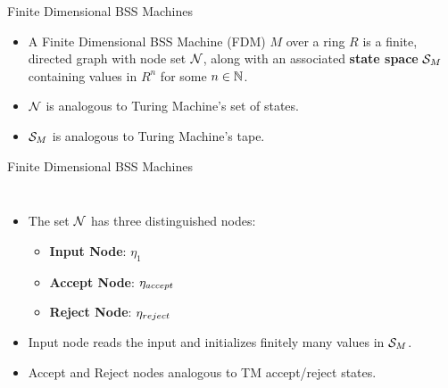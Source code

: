 \documentclass[c]{beamer}
\begin{document}
\begin{frame}{Finite Dimensional BSS Machines}

  \begin{itemize}
  \item A Finite Dimensional BSS Machine (FDM) $M$ over a ring $R$ is
    a finite, directed graph with node set $\mathcal{N}$, along with an
    associated \textbf{state space} $\mathcal{S}_M$ containing values
    in $R^n$ for some $n \in \mathbb{N}$.\pause
  \item $\mathcal{N}$ is analogous to Turing Machine's set of
    states.
  \item $\mathcal{S}_M$ is analogous to Turing Machine's tape.
  \end{itemize}

\end{frame}

\begin{frame}{Finite Dimensional BSS Machines}
  \begin{columns}
    
    \begin{itemize}
    \item The set $\mathcal{N}$ has three distinguished nodes:
      \begin{itemize}
      \item \textbf{Input Node}: $\eta_1$
      \item \textbf{Accept Node}: $\eta_{accept}$
      \item \textbf{Reject Node}: $\eta_{reject}$
      \end{itemize}
    \item Input node reads the input and initializes finitely many
      values in $\mathcal{S}_M$.
    \item Accept and Reject nodes analogous to TM accept/reject
      states.
    \end{itemize}
    \begin{center}
      \scaletopagewidth[.9]{\mandelrecpI{}}
    \end{center}
  \end{columns}

\end{frame}
\end{document}

